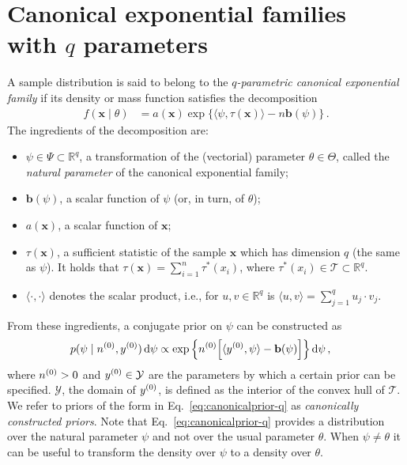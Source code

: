 \documentclass[12pt,a4paper	,twoside]{article}
\newcommand{\reals}{\mathbb{R}}
\newcommand{\dd}{\,\mathrm{d}}
\newcommand{\mbf}[1]{\mathbf{#1}}
\newcommand{\bs}[1]{\boldsymbol{#1}}
\renewcommand{\vec}[1]{{\bs#1}}
\begin{document}
\section{Canonical exponential families\\ with $q$ parameters}
\label{sec:q-paramexpofam}

A sample distribution is said to belong to the \emph{$q$-parametric canonical exponential family}
if its density or mass function satisfies the decomposition
\begin{align}
f(\vec{x} \mid \theta) &= a(\vec{x})\exp\big\{\langle \psi, \tau(\vec{x}) \rangle - n \mbf{b}(\psi)\big\}\,.
\label{eq:expofam-sampledens-q}
\end{align}
The ingredients of the decomposition are:
\begin{itemize}
\item $\psi \in \Psi \subset \reals^q$, a transformation of the (vectorial) parameter $\theta \in \Theta$,
called the \emph{natural parameter} of the canonical exponential family;
\item $\mbf{b}(\psi)$, a scalar function of $\psi$ (or, in turn, of $\theta$);
\item $a(\vec{x})$, a scalar function of $\vec{x}$;
\item $\tau(\vec{x})$, a sufficient statistic of the sample $\vec{x}$ which has dimension $q$ (the same as $\psi$).
It holds that $\tau(\vec{x}) = \sum_{i=1}^n \tau^*(x_i)$,
where $\tau^*(x_i) \in \mathcal{T} \subset \reals^q$.
\item $\langle\cdot, \cdot\rangle$ denotes the scalar product,
i.e., for $u, v \in \reals^q$ is $\langle u, v\rangle = \sum_{j=1}^q u_j \cdot v_j$.
\end{itemize}

From these ingredients, a conjugate prior on $\psi$ can be constructed as
\begin{align}
p(\psi \mid \nz, \yz) \dd\psi
 &\propto \exp\Big\{ \nz \Big[ \langle \yz, \psi \rangle - \mbf{b}(\psi) \Big] \Big\} \dd\psi\,,
\label{eq:canonicalprior-q}
\end{align}
where $n^{(0)} > 0$ and $y^{(0)} \in \mathcal{Y}$ are the parameters by which a certain prior can be specified.
$\mathcal{Y}$, the domain of $y^{(0)}$, is defined as the interior of the convex hull of $\mathcal{T}$.
We refer to priors of the form in Eq.~\eqref{eq:canonicalprior-q} as \emph{canonically constructed priors}.
Note that Eq.~\eqref{eq:canonicalprior-q} provides a distribution over the natural parameter $\psi$ and not over the usual parameter $\theta$.
When $\psi \neq \theta$ it can be useful to transform the density over $\psi$ to a density over $\theta$.
\end{document}
